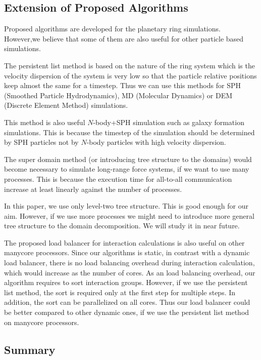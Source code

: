 \documentclass[]{pasj01}
\begin{document}
\subsection{Extension of Proposed Algorithms}

Proposed algorithms are developed for the planetary ring
simulations. However,we believe that some of them are also useful for
other particle based simulations.

The persistent list method is based on the nature of the ring system
which is the velocity dispersion of the system is very low so that the
particle relative positions keep almost the same for a timestep. Thus
we can use this methods for SPH (Smoothed Particle Hydrodynamics), MD
(Molecular Dynamics) or DEM (Discrete Element Method) simulations.

This method is also useful $N$-body+SPH simulation such as galaxy
formation simulations. This is because the timestep of the simulation
should be determined by SPH particles not by $N$-body particles with
high velocity dispersion.

The super domain method (or introducing tree structure to the domains)
would become necessary to simulate long-range force systems, if we
want to use many processes. This is because the execution time for
all-to-all communication increase at least linearly against the number
of processes.

In this paper, we use only level-two tree structure. This is good
enough for our aim. However, if we use more processes we might need to
introduce more general tree structure to the domain decomposition. We
will study it in near future.

The proposed load balancer for interaction calculations is also useful
on other manycore processors. Since our algorithms is static, in
contrast with a dynamic load balancer, there is no load balancing
overhead during interaction calculation, which would increase as the
number of cores. As an load balancing overhead, our algorithm requires
to sort interaction groups. However, if we use the persistent list
method, the sort is required only at the first step for multiple
steps. In addition, the sort can be parallelized on all cores. Thus
our load balancer could be better compared to other dynamic ones, if
we use the persistent list method on manycore processors.

\subsection{Summary}
\end{document}
